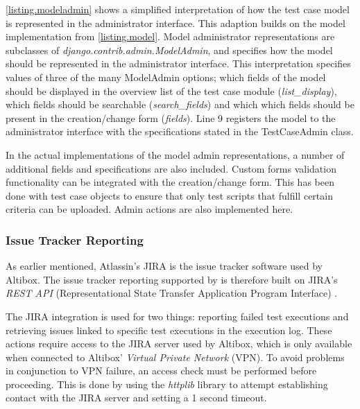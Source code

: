\lstlistingname \space \ref{listing.modeladmin} shows a simplified interpretation of how the test case model is represented in the administrator interface. This adaption builds on the model implementation from \lstlistingname \space \ref{listing.model}. Model administrator representations are subclasses of \emph{django.contrib.admin.ModelAdmin}, and specifies how the model should be represented in the administrator interface. This interpretation specifies values of three of the many ModelAdmin options; which fields of the model should be displayed in the overview list of the test case module (\emph{list\_display}), which fields should be searchable (\emph{search\_fields}) and which which fields should be present in the creation/change form (\emph{fields}). Line 9 registers the model to the administrator interface with the specifications stated in the TestCaseAdmin class.

In the actual implementations of the model admin representations, a number of additional fields and specifications are also included. Custom forms validation functionality can be integrated with the creation/change form. This has been done with test case objects to ensure that only test scripts that fulfill certain criteria can be uploaded. Admin actions are also implemented here.


\subsubsection{Issue Tracker Reporting}

As earlier mentioned, Atlassin's JIRA is the issue tracker software used by Altibox. The issue tracker reporting supported by \toolname \space is therefore built on JIRA's \emph{REST API} (Representational State Transfer Application Program Interface) \cite{https://www.crummy.com/writing/RESTful-Web-Services/RESTful_Web_Services.pdf}.

The JIRA integration is used for two things: reporting failed test executions and retrieving issues linked to specific test executions in the execution log. These actions require access to the JIRA server used by Altibox, which is only available when connected to Altibox' \emph{Virtual Private Network} (VPN). To avoid problems in conjunction to VPN failure, an access check must be performed before proceeding. This is done by using the \emph{httplib} library to attempt establishing contact with the JIRA server and setting a 1 second timeout.

